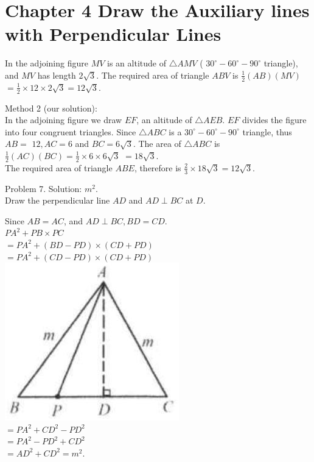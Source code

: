 \documentclass[10pt]{article}
\begin{document}
\section*{Chapter 4 Draw the Auxiliary lines with Perpendicular Lines}
In the adjoining figure \(M V\) is an altitude of \(\triangle A M V\) ( \(30^{\circ}-60^{\circ}-90^{\circ}\) triangle), and \(M V\) has length \(2 \sqrt{3}\). The required area of triangle \(A B V\) is \(\frac{1}{2}(A B)(M V)\)\\
\(=\frac{1}{2} \times 12 \times 2 \sqrt{3}=12 \sqrt{3}\).

Method 2 (our solution):\\
In the adjoining figure we draw \(E F\), an altitude of \(\triangle A E B\). \(E F\) divides the figure into four congruent triangles. Since \(\triangle A B C\) is a \(30^{\circ}-60^{\circ}-90^{\circ}\) triangle, thus \(A B=\) \(12, A C=6\) and \(B C=6 \sqrt{3}\). The area of \(\triangle A B C\) is \(\frac{1}{2}(A C)(B C)=\frac{1}{2} \times 6 \times 6 \sqrt{3}\) \(=18 \sqrt{3}\).\\
The required area of triangle \(A B E\), therefore is \(\frac{2}{3} \times 18 \sqrt{3}=12 \sqrt{3}\).

Problem 7. Solution: \(m^{2}\).\\
Draw the perpendicular line \(A D\) and \(A D \perp B C\) at \(D\).

Since \(A B=A C\), and \(A D \perp B C, B D=C D\).\\
\(P A^{2}+P B \times P C\)\\
\(=P A^{2}+(B D-P D) \times(C D+P D)\)\\
\(=P A^{2}+(C D-P D) \times(C D+P D)\)\\
\includegraphics[max width=\textwidth, center]{2025_04_17_97bc1f7e44d93c271a88g-094}\\
\(=P A^{2}+C D^{2}-P D^{2}\)\\
\(=P A^{2}-P D^{2}+C D^{2}\)\\
\(=A D^{2}+C D^{2}=m^{2}\).
\end{document}

